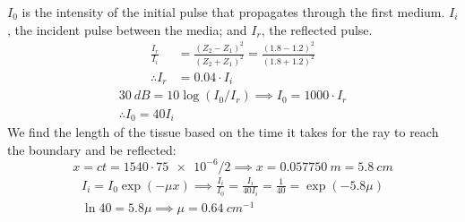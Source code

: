 $I_0$ is the intensity of the initial pulse that propagates through the first medium. $I_i$, the incident pulse between the media; and $I_r$, the reflected pulse.
\begin{equation}
    \begin{split}
        \frac{I_{r}}{I_{i}} &= \frac{ {(Z_2 - Z_1)}^2 }{ {(Z_2 + Z_1)}^2 } = \frac{ {(1.8-1.2)}^2 }{ {(1.8+1.2)}^2}\\
        \therefore I_r &= 0.04 \cdot I_i 
    \end{split}
\end{equation}
\begin{equation}\begin{split}
    \SI{30}{dB} = 10\log (I_0/I_r) \implies I_0 = 1000\cdot I_r \\
    \therefore I_0 = 40 I_i    
\end{split}
\end{equation}
We find the length of the tissue based on the time it takes for the ray to reach the boundary and be reflected:
\begin{equation}
    x = ct = 1540 \cdot \num{75e-6}/2 \implies x = \SI{0.057750}{m} = \SI{5.8}{cm}
\end{equation}
\begin{equation}\begin{split}
    I_i = I_0 \exp(-\mu x) \implies \frac{I_i}{I_0} =\frac{I_i}{40I_i} = \frac{1}{40} = \exp(-5.8 \mu ) \\
    \ln 40 = 5.8\mu \implies \mu = \SI{0.64}{cm^{-1}}
\end{split}
\end{equation}